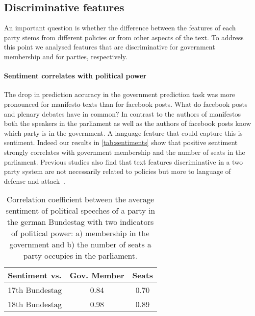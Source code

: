 \documentclass[11pt]{article}
\begin{document}
\subsection{Discriminative features}
\label{sec:discrim_effect}
An important question is whether the difference between the features of each party stems from different policies or from other aspects of the text. To address this point we analysed features that are discriminative for government membership and for parties, respectively.

\paragraph{Sentiment correlates with political power}
The drop in prediction accuracy in the government prediction task was more pronounced for manifesto texts than for facebook posts. What do facebook posts and plenary debates have in common? In contrast to the authors of manifestos both the speakers in the parliament as well as the authors of facebook posts know which party is in the government. A language feature that could capture this is sentiment. 
Indeed our results in \autoref{tab:sentiments} show that positive sentiment strongly correlates with government membership and the number of seats in the parliament.  Previous studies also find that text features discriminative in a two party system are not necessarily related to policies but more to language of defense and attack~\cite{Hirst2014}. 

\begin{table}[t]
\caption{
\label{tab:sentiments}
Correlation coefficient between the average sentiment of political speeches of a party in the german Bundestag with two indicators of political power: a) membership in the government and b) the number of seats a party occupies in the parliament.
}
\begin{center}
\begin{tabular}{lcc}
   Sentiment vs. &          Gov. Member    &  Seats\\
\hline\hline
17th Bundestag    &  0.84 & 0.70\\
18th Bundestag   &  0.98 & 0.89\\
%
\end{tabular}
\end{center}
\end{table}
\end{document}
